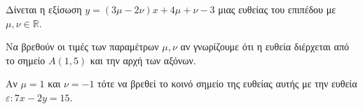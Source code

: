 Δίνεται η εξίσωση $ y=(3\mu-2\nu)x+4\mu+\nu-3 $ μιας ευθείας του επιπέδου με $ \mu,\nu\in\mathbb{R} $.
\begin{rlist}
\item Να βρεθούν οι τιμές των παραμέτρων $ \mu,\nu $ αν γνωρίζουμε ότι η ευθεία διέρχεται από το σημείο $ A(1,5) $ και την αρχή των αξόνων.
\item Αν $ \mu=1 $ και $ \nu=-1 $ τότε να βρεθεί το κοινό σημείο της ευθείας αυτής με την ευθεία $ \varepsilon : 7x-2y=15 $.
\end{rlist}